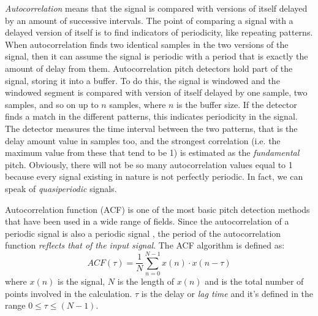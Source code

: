 \emph{Autocorrelation} means that the signal is compared with versions of itself delayed by an amount of successive intervals. The point of comparing a signal with a delayed version of itself is to find indicators of periodicity, like repeating patterns. When autocorrelation finds two identical samples in the two versions of the signal, then it can assume the signal is periodic with a period that is exactly the amount of delay from them. Autocorrelation pitch detectors hold part of the signal, storing it into a buffer. To do this, the signal is windowed and the windowed segment is compared with version of itself delayed by one sample, two samples, and so on up to $n$ samples, where $n$ is the buffer size. If the detector finds a match in the different patterns, this indicates periodicity in the signal. The detector measures the time interval between the two patterns, that is the delay amount value in samples too, and the strongest correlation (i.e. the maximum value from these that tend to be 1) is estimated as the \emph{fundamental} pitch. Obviously, there will not be so many autocorrelation values equal to 1 because every signal existing in nature is not perfectly periodic. In fact, we can speak of \emph{quasiperiodic} signals.

Autocorrelation function (ACF) is one of the most basic pitch detection methods that have been used in a wide range of fields. Since the autocorrelation of a periodic signal is also a periodic signal \cite{tan2003pitch}, the period of the autocorrelation function \emph{reflects that of the input signal}. The ACF algorithm is defined as:
\newline
\begin{equation}
\label{eq:acf} 
ACF(\tau) = \frac{1}{N} \sum_{n = 0}^{N - 1} x(n)\cdot x(n - \tau)
\end{equation}
where $x(n)$ is the signal, $N$ is the length of $x(n)$ and is the total number of points involved in the calculation. $\tau$ is the delay or \emph{lag time} and it's defined in the range $0 \le \tau \le (N - 1)$.


